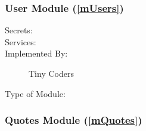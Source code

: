 \documentclass[12pt, titlepage]{article}
\newcommand{\mref}[1]{M\ref{#1}}
\begin{document}



\subsubsection{User Module (\ref{mUsers})}

\begin{description}
	\item[Secrets:]
	\item[Services:]
	\item[Implemented By:] Tiny Coders
	\item[Type of Module:]
\end{description}

\subsubsection{Quotes Module (\ref{mQuotes})}
\end{document}
